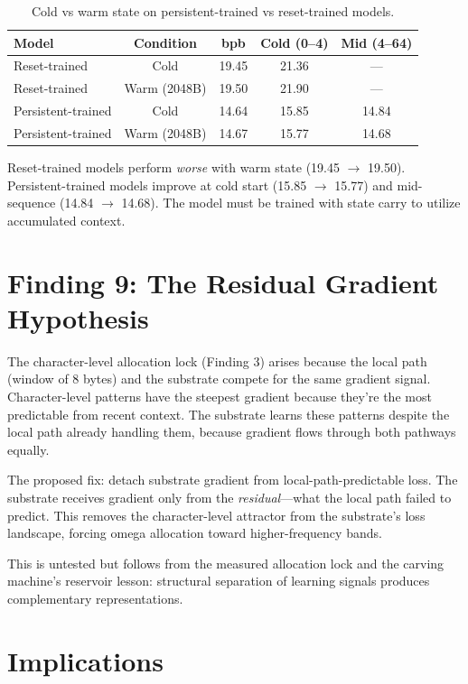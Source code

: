 \documentclass[11pt,a4paper]{article}
\begin{document}
\begin{table}[h]
\centering
\caption{Cold vs warm state on persistent-trained vs reset-trained models.}
\begin{tabular}{lcccc}
\toprule
Model & Condition & bpb & Cold (0--4) & Mid (4--64) \\
\midrule
Reset-trained & Cold & 19.45 & 21.36 & --- \\
Reset-trained & Warm (2048B) & 19.50 & 21.90 & --- \\
\midrule
Persistent-trained & Cold & 14.64 & 15.85 & 14.84 \\
Persistent-trained & Warm (2048B) & 14.67 & 15.77 & 14.68 \\
\bottomrule
\end{tabular}
\end{table}

Reset-trained models perform \emph{worse} with warm state (19.45 $\to$ 19.50). Persistent-trained models improve at cold start (15.85 $\to$ 15.77) and mid-sequence (14.84 $\to$ 14.68). The model must be trained with state carry to utilize accumulated context.

\section{Finding 9: The Residual Gradient Hypothesis}

The character-level allocation lock (Finding 3) arises because the local path (window of 8 bytes) and the substrate compete for the same gradient signal. Character-level patterns have the steepest gradient because they're the most predictable from recent context. The substrate learns these patterns despite the local path already handling them, because gradient flows through both pathways equally.

The proposed fix: detach substrate gradient from local-path-predictable loss. The substrate receives gradient only from the \emph{residual}---what the local path failed to predict. This removes the character-level attractor from the substrate's loss landscape, forcing omega allocation toward higher-frequency bands.

This is untested but follows from the measured allocation lock and the carving machine's reservoir lesson: structural separation of learning signals produces complementary representations.

\section{Implications}
\end{document}
